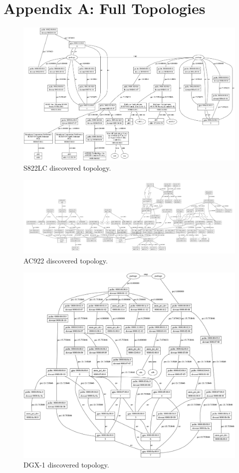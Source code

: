 \chapter{Appendix A: Full Topologies}
\label{ch:full-topos}

\renewcommand\thefigure{A.\arabic{figure}} 

\begin{figure}[ht]
    \centering
    \includegraphics[width=\textwidth]{figures/topo-minsky-actual.png}
    \caption{S822LC discovered topology.}
    \label{fig:topo-minsky-actual}
\end{figure}

\begin{figure}[ht]
    \centering
    \includegraphics[width=\textwidth]{figures/topo-ac922-actual.pdf}
    \caption{AC922 discovered topology.}
    \label{fig:topo-ac922-actual}
\end{figure}

\begin{figure}[ht]
    \centering
    \includegraphics[width=\textwidth]{figures/topo-dgx1-actual.png}
    \caption{DGX-1 discovered topology.}
    \label{fig:topo-dgx-actual}
\end{figure}
